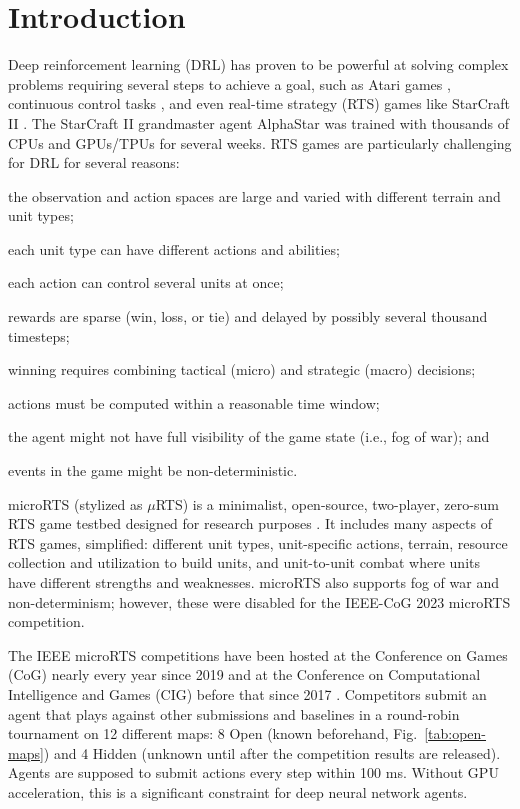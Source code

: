 \documentclass[conference]{IEEEtran}
\begin{document}
\section{Introduction}
Deep reinforcement learning (DRL) has proven to be powerful at solving complex
problems requiring several steps to achieve a goal, such as Atari games \cite{DBLP:journals/corr/MnihKSGAWR13}, continuous
control tasks \cite{DBLP:journals/corr/LillicrapHPHETS15}, and even real-time strategy
(RTS) games like StarCraft II \cite{Vinyals2019GrandmasterLI}. The StarCraft II
grandmaster agent AlphaStar was trained with thousands of
CPUs and GPUs/TPUs for several weeks. RTS games are particularly challenging for DRL for
several reasons:
\begin{inparaenum}[(1)]
    \item the observation and action spaces are large and varied with different terrain and
        unit types;
    \item each unit type can have different actions and abilities;
    \item each action can control several units at once;
    \item rewards are sparse (win, loss, or tie) and delayed by possibly several
    thousand timesteps;
    \item winning requires combining tactical (micro) and strategic (macro) decisions;
    \item actions must be computed within a reasonable time window;
    \item the agent might not have full visibility of the game state (i.e., fog of war); and
    \item events in the game might be non-deterministic.
\end{inparaenum}

microRTS (stylized as $\mu$RTS) is a minimalist, open-source, two-player, zero-sum RTS game testbed designed for research
purposes \cite{DBLP:conf/aiide/Ontanon13}. It includes many aspects of RTS games, simplified: different unit types, unit-specific
actions, terrain, resource collection and utilization to build units, and unit-to-unit combat
where units have different strengths and weaknesses. microRTS also supports fog of war
and non-determinism; however, these were disabled for the IEEE-CoG 2023 microRTS
competition.

The IEEE microRTS competitions have been hosted at the Conference on Games (CoG) nearly
every year since 2019 and at the Conference on Computational Intelligence and Games
(CIG) before that since 2017 \cite{Ontañón_Barriga_Silva_Moraes_Lelis_2018}.
Competitors submit an agent that plays against other submissions and baselines in a round-robin tournament
on 12 different maps: 8 Open (known beforehand, Fig.~\ref{tab:open-maps}) and 4 Hidden (unknown until after the
competition results are released). Agents are supposed
to submit actions every step within 100 ms. Without GPU acceleration, this is a significant constraint for deep neural
network agents.
\end{document}
